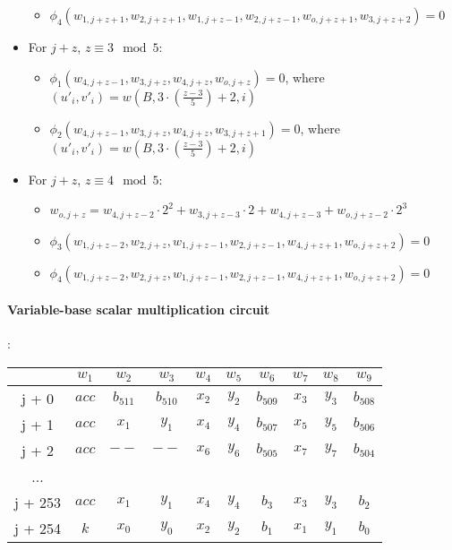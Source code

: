 \begin{itemize}
\begin{itemize}
            \item $\phi_4(w_{1, j + z + 1}, w_{2, j + z + 1}, w_{1, j + z - 1}, w_{2, j + z - 1}, w_{o, j + z + 1}, w_{3, j + z + 2}) = 0$
        \end{itemize}
    \item For $j + z$, $z \equiv 3 \mod 5$:
        \begin{itemize}
            \item $\phi_1(w_{4, j + z - 1}, w_{3, j + z}, w_{4, j + z}, w_{o, j + z}) = 0$, where $(u'_{i}, v'_{i}) = w(B, 3 \cdot (\frac{z - 3}{5}) + 2, i)$
            \item $\phi_2(w_{4, j + z - 1}, w_{3, j + z}, w_{4, j + z}, w_{3, j + z + 1}) = 0$, where $(u'_{i}, v'_{i}) = w(B, 3 \cdot (\frac{z - 3}{5}) + 2, i)$
        \end{itemize}
    \item For $j + z$, $z \equiv 4 \mod 5$:
        \begin{itemize}
            \item $w_{o, j + z} = w_{4,j + z - 2} \cdot 2^2 + w_{3,j + z - 3} \cdot 2 + w_{4, j + z - 3} + w_{o, j + z - 2} \cdot 2^3$
            \item $\phi_3(w_{1, j + z - 2}, w_{2, j + z}, w_{1, j + z - 1}, w_{2, j + z - 1}, w_{4, j + z + 1}, w_{o, j + z + 2}) = 0$
            \item $\phi_4(w_{1, j + z - 2}, w_{2, j + z}, w_{1, j + z - 1}, w_{2, j + z - 1}, w_{4, j + z + 1}, w_{o, j + z + 2}) = 0$
        \end{itemize}
\end{itemize}

\paragraph{Variable-base scalar multiplication circuit}:
\begin{center}
    \begin{tabular}{ c|c|c|c|c|c|c|c|c|c }
        & $w_1$  & $w_2$  & $w_3$  & $w_4$  & $w_5$  & $w_6$ & $w_7$ & $w_8$ & $w_9$  \\
        \hline
        j + 0  & $acc$  & $b_{511}$ & $b_{510}$ & $x_2$   & $y_2$ & $b_{509}$  & $x_3$ & $y_3$ & $b_{508}$    \\
        j + 1  & $acc$ & $x_1$  & $ y_1$  & $x_4$ & $ y_4$ & $b_{507}$  & $x_5$ & $y_5$ & $b_{506}$ \\
        j + 2  & $acc$  & $--$ & $--$  & $x_6$ & $y_6$ & $b_{505}$ & $x_7$ & $y_7$  & $b_{504}$  \\
        ...     &             &            &           &             &           \\
        j + 253  & $acc$ & $x_1$  & $ y_1$  & $x_4$ & $ y_4$ & $b_{3}$  & $x_3$ & $y_3$ & $b_{2}$ \\
        j + 254  & $k$ & $x_0$ & $y_0$ & $x_2$ & $y_2$ & $b_{1}$   & $x_1$ & $y_1$  & $b_{0}$    \\
    \end{tabular}
\end{center}

